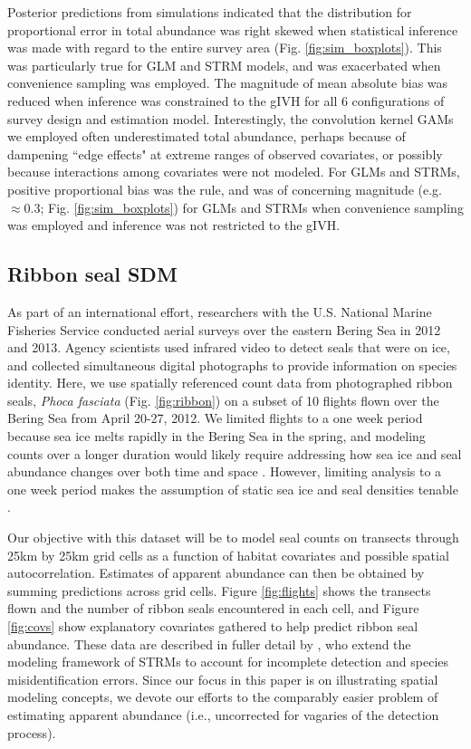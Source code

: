 \documentclass[12pt,english]{article}
\begin{document}
\begin{spacing}{1.9}
Posterior predictions from simulations indicated that the distribution for proportional error in total abundance was right skewed when statistical inference was made with regard to the entire survey area (Fig. \ref{fig:sim_boxplots}).  This was particularly true for GLM and STRM models, and was exacerbated when convenience sampling was employed.  The magnitude of mean absolute bias was reduced when inference was constrained to the gIVH for all 6 configurations of survey design and estimation model.  Interestingly, the convolution kernel GAMs we employed often underestimated total abundance, perhaps because of dampening ``edge effects" at extreme ranges of observed covariates, or possibly because interactions among covariates were not modeled.  For GLMs and STRMs, positive proportional bias was the rule, and was of concerning magnitude (e.g. $\approx 0.3$; Fig. \ref{fig:sim_boxplots}) for GLMs and STRMs when convenience sampling was employed and inference was not restricted to the gIVH.  


\subsection{Ribbon seal SDM}
As part of an international effort, researchers with the U.S. National Marine Fisheries Service conducted aerial surveys over the eastern Bering Sea in 2012 and 2013.  Agency scientists used infrared video to detect seals that were on ice, and collected simultaneous digital photographs to provide information on species identity. Here, we use spatially referenced count data from photographed ribbon seals, {\it Phoca fasciata} (Fig. \ref{fig:ribbon}) on a subset of 10 flights flown over the Bering Sea from April 20-27, 2012.  We limited flights to a one week period because sea ice melts rapidly in the Bering Sea in the spring, and modeling counts over a longer duration would likely require addressing how sea ice and seal abundance changes over both time and space \citep[see][]{ConnEtAl2015}. However, limiting analysis to a one week period makes the assumption of static sea ice and seal densities tenable \citep{ConnEtAl2014}.

Our objective with this dataset will be to model seal counts on transects through 25km by 25km grid cells as a function of habitat covariates and possible spatial autocorrelation. Estimates of apparent abundance can then be obtained by summing predictions across grid cells. Figure \ref{fig:flights} shows the transects flown and the number of ribbon seals encountered in each cell, and Figure \ref{fig:covs} show explanatory covariates gathered to help predict ribbon seal abundance.  These data are described in fuller detail by \citet{ConnEtAl2014}, who extend the modeling framework of STRMs to account for incomplete detection and species misidentification errors.  Since our focus in this paper is on illustrating spatial modeling concepts, we devote our efforts to the comparably easier problem of estimating apparent abundance (i.e., uncorrected for vagaries of the detection process).


\end{spacing}
\end{document}
